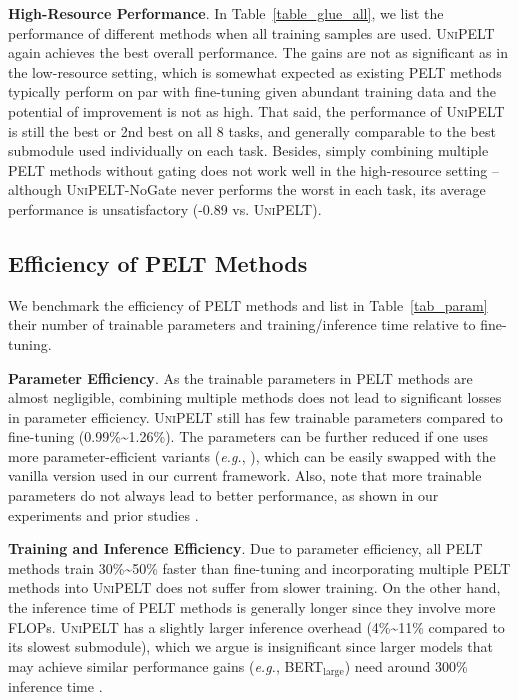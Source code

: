{{\bf High-Resource Performance}.} In Table~\ref{table_glue_all}, we list the performance of different methods when all training samples are used.
\textsc{UniPELT} again achieves the best overall performance. The gains are not as significant as in the low-resource setting, which is somewhat expected as existing PELT methods typically perform on par with fine-tuning given abundant training data and the potential of improvement is not as high. That said, the performance of \textsc{UniPELT} is still the best or 2nd best on all 8 tasks, and generally comparable to the best submodule used individually on each task. Besides, simply combining multiple PELT methods without gating does not work well in the high-resource setting -- although \textsc{UniPELT}-NoGate never performs the worst in each task, its average performance is unsatisfactory (-0.89 vs. \textsc{UniPELT}).

\subsection{Efficiency of PELT Methods} We benchmark the efficiency of PELT methods and list in Table~\ref{tab_param} their number of trainable parameters and training/inference time relative to fine-tuning.

{{\bf Parameter Efficiency}.} As the trainable parameters in PELT methods are almost negligible, combining multiple methods does not lead to significant losses in parameter efficiency. \textsc{UniPELT} still has few trainable parameters compared to fine-tuning (0.99\%\textasciitilde1.26\%).
The parameters can be further reduced if one uses more parameter-efficient variants (\textit{e.g.}, \citet{mahabadi2021compacter}), which can be easily swapped with the vanilla version used in our current framework. Also, note that more trainable parameters do not always lead to better performance, as shown in our experiments and prior studies \cite{he-etal-2021-effectiveness,pfeiffer-etal-2021-adapterfusion}.

{{\bf Training and Inference Efficiency}.} Due to parameter efficiency, all PELT methods train 30\%\textasciitilde50\% faster than fine-tuning and incorporating multiple PELT methods into \textsc{UniPELT} does not suffer from slower training. On the other hand, the inference time of PELT methods is generally longer since they involve more FLOPs. \textsc{UniPELT} has a slightly larger inference overhead (4\%\textasciitilde11\% compared to its slowest submodule), which we argue is insignificant since larger models that may achieve similar performance gains (\textit{e.g.}, BERT$_\text{large}$) need around 300\% inference time \cite{hf_benchmark}.

